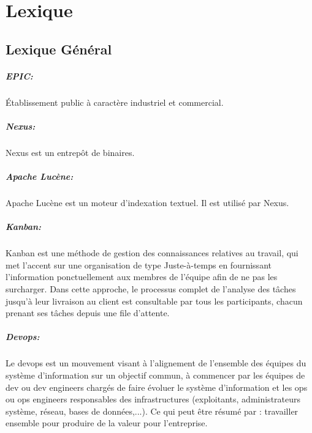 \chapter{Lexique}

\section{Lexique Général}

\paragraph{EPIC: }
\label{lexi:epic}
Établissement public à caractère industriel et commercial.

\paragraph{Nexus: }
\label{lexi:nexus}
Nexus est un entrepôt de binaires.

\paragraph{Apache Lucène:}
\label{lexi:lucene}
Apache Lucène est un moteur d'indexation textuel. Il est utilisé par Nexus.

\paragraph{Kanban: }
\label{lexi:kanban}
Kanban est une méthode de gestion des connaissances relatives au travail,
qui met l’accent sur une organisation de type Juste-à-temps en fournissant l'information ponctuellement aux membres de l'équipe afin de ne pas les surcharger.
Dans cette approche, le processus complet de l'analyse des tâches jusqu’à leur livraison au client est consultable par tous les participants,
chacun prenant ses tâches depuis une file d'attente.

\paragraph{Devops: }
\label{lexi:devops}
Le devops est un mouvement visant à l'alignement de l'ensemble des équipes du système d'information sur un objectif commun,
à commencer par les équipes de dev ou dev engineers chargés de faire évoluer le système d'information et les ops ou ops engineers responsables des infrastructures (exploitants, administrateurs système, réseau, bases de données,...).
Ce qui peut être résumé par : travailler ensemble pour produire de la valeur pour l'entreprise.


